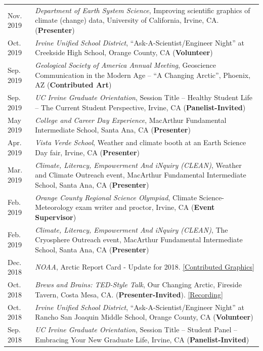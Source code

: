 \documentclass[margin,line,palatino,courier,10pt]{res}
\begin{document}
\begin{resume}
\begin{tabular}{@{}p{0.9in}p{4in}}
Nov. 2019 & \textit{Department of Earth System Science}, Improving scientific graphics of climate (change) data, University of California, Irvine, CA. (\textbf{Presenter})\\
Oct. 2019 & \textit{Irvine Unified School District}, ``Ask-A-Scientist/Engineer Night'' at Creekside High School, Orange County, CA (\textbf{Volunteer})\\
Sep. 2019 & \textit{Geological Society of America Annual Meeting}, Geoscience Communication in the Modern Age -- ``A Changing Arctic'', Phoenix, AZ (\textbf{Contributed Art})\\
Sep. 2019 & \textit{UC Irvine Graduate Orientation}, Session Title -- Healthy Student Life -- The Current Student Perspective, Irvine, CA (\textbf{Panelist-Invited})\\
May 2019 & \textit{College and Career Day Experience}, MacArthur Fundamental Intermediate School, Santa Ana, CA (\textbf{Presenter})\\
Apr. 2019 & \textit{Vista Verde School}, Weather and climate booth at an Earth Science Day fair, Irvine, CA (\textbf{Presenter})\\
Mar. 2019 & \textit{Climate, Literacy, Empowerment And iNquiry (CLEAN)}, Weather and Climate Outreach event, MacArthur Fundamental Intermediate School, Santa Ana, CA (\textbf{Presenter})\\
Feb. 2019 & \textit{Orange County Regional Science Olympiad}, Climate Science-Meteorology exam writer and proctor, Irvine, CA (\textbf{Event Supervisor})\\
Feb. 2019 & \textit{Climate, Literacy, Empowerment And iNquiry (CLEAN)}, The Cryosphere Outreach event, MacArthur Fundamental Intermediate School, Santa Ana, CA (\textbf{Presenter})\\
Dec. 2018 & \textit{NOAA}, Arctic Report Card - Update for 2018. \href{https://www.youtube.com/watch?v=XntO9a-NpeM}{[Contributed Graphics]}\\
Oct. 2018 & \textit{Brews and Brains: TED-Style Talk}, Our Changing Arctic, Fireside Tavern, Costa Mesa, CA. (\textbf{Presenter-Invited}). \href{https://www.youtube.com/watch?v=A5qQpDtOdvg}{[Recording]}\\
Oct. 2018 & \textit{Irvine Unified School District}, ``Ask-A-Scientist/Engineer Night'' at Rancho San Joaquin Middle School, Orange County, CA (\textbf{Volunteer})\\
Sep. 2018 & \textit{UC Irvine Graduate Orientation}, Session Title -- Student Panel -- Embracing Your New Graduate Life, Irvine, CA (\textbf{Panelist-Invited})\\

\end{tabular}
\end{resume}
\end{document}
